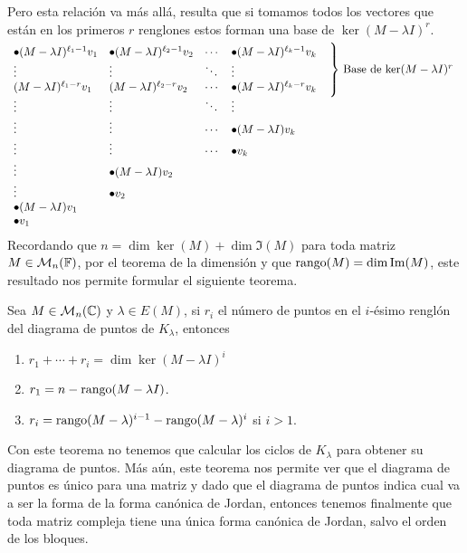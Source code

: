 Pero esta relación va más allá, resulta que si tomamos todos los vectores que están en los primeros $r$ renglones estos forman una base de $\ker(M-\lambda I)^r$.
\[
  \begin{array}{llll@{\quad}l} 
    \bullet (M-\lambda I)^{\ell_1-1}v_1 & \bullet (M-\lambda I)^{\ell_2-1}v_2 & \cdots & \bullet (M-\lambda I)^{\ell_k-1}v_k  & \\
    \vdots & \vdots & \ddots & \vdots &
        \raisebox{0.35em}{\smash{$ \left.\rule{0pt}{1cm}\right\}$ Base de $\ker(M-\lambda I)^r$ }}\\
    (M-\lambda I)^{\ell_1-r}v_1 & (M-\lambda I)^{\ell_2-r}v_2 & \cdots & \bullet (M-\lambda I)^{\ell_k-r}v_k  &   \\
    \vdots & \vdots & \ddots & \vdots &  \\
    \vdots & \vdots & \cdots & \bullet (M-\lambda I)v_k  &   \\
    \vdots & \vdots & \cdots & \bullet v_k  &   \\
    \vdots & \bullet (M-\lambda I)v_2  & & &  \\
    \vdots & \bullet v_2  & &  &  \\
    \bullet (M-\lambda I)v_1 & & & &  \\
    \bullet v_1 & & & & \\
  \end{array}
\]
Recordando que $n = \dim\ker(M) + \dim\Im(M)$ para toda matriz $M \in \mathcal{M}_n(\mathbb{F})$, por el teorema de la dimensión y que $\operatorname{rango}(M) = \dim \operatorname{Im}(M)$, este resultado nos permite formular el siguiente teorema.

\begin{teor}
  Sea $M \in \mathcal{M}_n(\mathbb{C})$ y $\lambda \in E(M)$, si $r_i$ el número de puntos en el $i$-ésimo renglón del diagrama de puntos de $K_\lambda$, entonces
  \begin{enumerate}
    \item $r_1 + \cdots + r_i = \dim \ker(M-\lambda I)^i $
    \item $r_1 = n - \operatorname{rango}(M-\lambda I)$.
    \item $r_i = \operatorname{rango}(M-\lambda)^{i-1} - \operatorname{rango}(M-\lambda)^i$ si $i>1$.
  \end{enumerate}
\end{teor}

Con este teorema no tenemos que calcular los ciclos de $K_\lambda$ para obtener su diagrama de puntos. Más aún, este teorema nos permite ver que el diagrama de puntos es único para una matriz y dado que el diagrama de puntos indica cual va a ser la forma de la forma canónica de Jordan, entonces tenemos finalmente que toda matriz compleja tiene una única forma canónica de Jordan, salvo el orden de los bloques.

